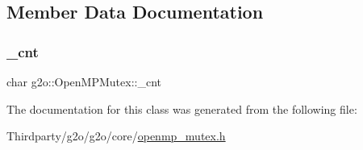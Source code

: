 \subsection{Member Data Documentation}
\mbox{\label{classg2o_1_1_open_m_p_mutex_a0cb363393694ee0dd15f822fbda7645a}} 
\subsubsection{\texorpdfstring{\+\_\+cnt}{\_cnt}}
{\footnotesize\ttfamily char g2o\+::\+Open\+M\+P\+Mutex\+::\+\_\+cnt\hspace{0.3cm}{\ttfamily [protected]}}



The documentation for this class was generated from the following file\+:\begin{DoxyCompactItemize}
\item 
Thirdparty/g2o/g2o/core/\mbox{\hyperlink{openmp__mutex_8h}{openmp\+\_\+mutex.\+h}}\end{DoxyCompactItemize}
